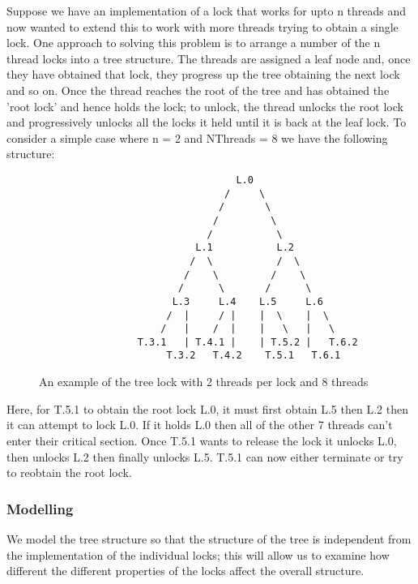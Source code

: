Suppose we have an implementation of a lock that works for upto n threads and now wanted to extend this to work with more threads trying to obtain a single lock. One approach to solving this problem is to arrange a number of the n thread locks into a tree structure. The threads are assigned a leaf node and, once they have obtained that lock, they progress up the tree obtaining the next lock and so on. Once the thread reaches the root of the tree and has obtained the 'root lock' and hence holds the lock; to unlock, the thread unlocks the root lock and progressively unlocks all the locks it held until it is back at the leaf lock. To consider a simple case where n = 2 and NThreads = 8 we have the following structure: 

\begin{figure}
\begin{verbatim}
                                  L.0
                                /     \                    
                               /       \
                              /         \
                             /           \
                           L.1           L.2
                          /  \           /  \
                         /    \         /    \
                        /      \       /      \
                       L.3     L.4    L.5     L.6
                      /  |     / |    |  \    |  \
                     /   |    /  |    |   \   |   \
                 T.3.1   | T.4.1 |    | T.5.2 |   T.6.2
                      T.3.2   T.4.2    T.5.1   T.6.1
\end{verbatim}
\caption{An example of the tree lock with 2 threads per lock and 8 threads \label{fig:Tree}}
\end{figure}

Here, for T.5.1 to obtain the root lock L.0, it must first obtain L.5 then L.2 then it can attempt to lock L.0. If it holds L.0 then all of the other 7 threads can't enter their critical section. Once T.5.1 wants to release the lock it unlocks L.0, then unlocks L.2 then finally unlocks L.5. T.5.1 can now either terminate or try to reobtain the root lock.

\subsubsection{Modelling}

We model the tree structure so that the structure of the tree is independent from the implementation of the individual locks; this will allow us to examine how different the different properties of the locks affect the overall structure.


